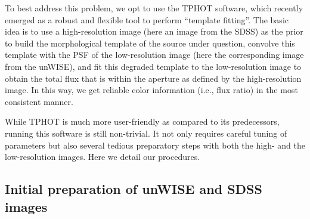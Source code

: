 \documentclass[numberedappendix,apj,twocolumn]{emulateapj}
\begin{document}
To best address this problem, we opt to use the TPHOT software, which recently emerged as a robust and flexible tool to perform ``template fitting''. The basic idea is to use a high-resolution image (here an image from the SDSS) as the prior to build the morphological template of the source under question, convolve this template with the PSF of the low-resolution image (here the corresponding image from the unWISE), and fit this degraded template to the low-resolution image to obtain the total flux that is within the aperture as defined by the high-resolution image. In this way, we get reliable color information (i.e., flux ratio) in the most consistent manner. 

While TPHOT is much more user-friendly as compared to its predecessors, running this software is still non-trivial. It not only requires careful tuning of parameters but also several tedious preparatory steps with both the high- and the low-resolution images. Here we detail our procedures.
	

\subsection{Initial preparation of unWISE and SDSS images} 

\end{document}
